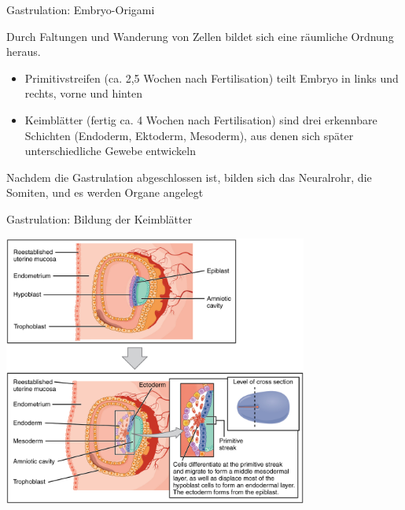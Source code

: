 \documentclass{beamer}
\begin{document}
\begin{frame}{Gastrulation: Embryo-Origami}

Durch Faltungen und Wanderung von Zellen bildet sich eine räumliche Ordnung heraus.
 
\begin{itemize}
    \item 
    Primitivstreifen (ca. 2,5 Wochen nach Fertilisation) teilt Embryo in links und rechts, vorne und hinten
    \item
    Keimblätter (fertig ca. 4 Wochen nach Fertilisation) sind drei erkennbare Schichten (Endoderm, Ektoderm, Mesoderm), aus denen sich später unterschiedliche Gewebe entwickeln
\end{itemize}

Nachdem die Gastrulation abgeschlossen ist, bilden sich das Neuralrohr, die Somiten, und es werden Organe angelegt
    
\end{frame}

\begin{frame}{Gastrulation: Bildung der Keimblätter}

\begin{center}
    \includegraphics[width=0.75\textwidth]{2908_Germ_Layers-02.jpg}
\end{center}



\end{frame}
\end{document}
